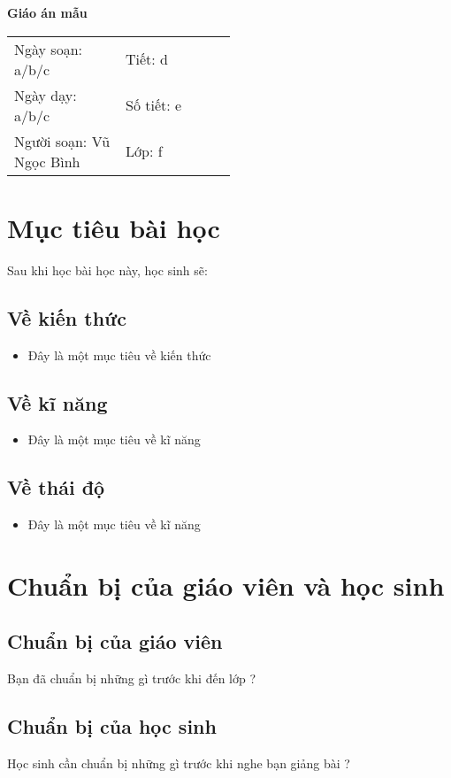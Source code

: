 \documentclass[12pt,a4paper]{article}
\author{Vũ Ngọc Binh}
\begin{document}
	\begin{center}
		\textbf{\LARGE Giáo án mẫu}
	\end{center}
	\begin{tabularx}{\linewidth}{ m{0.5\linewidth} X }
		Ngày soạn: a/b/c
		& 
		Tiết: d
		\\
		Ngày dạy: a/b/c
		& 
		Số tiết: e
		\\
		Người soạn: Vũ Ngọc Bình
		& 
		Lớp: f
		\\
	\end{tabularx}
	\section{Mục tiêu bài học}
	Sau khi học bài học này, học sinh sẽ:
	\subsection{Về kiến thức}
	\begin{itemize}
		\item Đây là một mục tiêu về kiến thức
	\end{itemize}
	\subsection{Về kĩ năng}
	\begin{itemize}
		\item Đây là một mục tiêu về kĩ năng
	\end{itemize}
	\subsection{Về thái độ}
	\begin{itemize}
		\item Đây là một mục tiêu về kĩ năng
	\end{itemize}
	\section{Chuẩn bị của giáo viên và học sinh}
	\subsection{Chuẩn bị của giáo viên}
	Bạn đã chuẩn bị những gì trước khi đến lớp ?
	\subsection{Chuẩn bị của học sinh}
	Học sinh cần chuẩn bị những gì trước khi nghe bạn giảng bài ?
\end{document}
